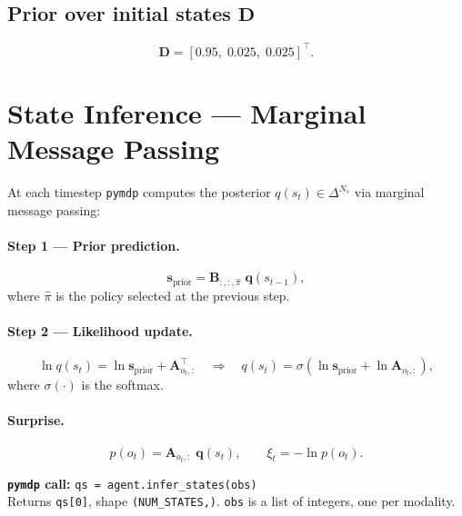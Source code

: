 \documentclass[11pt, a4paper]{article}
\newcommand{\vect}[1]{\bm{#1}}
\newcommand{\mat}[1]{\mathbf{#1}}
\begin{document}
\subsection{Prior over initial states $\mat{D}$}
\begin{equation}
  \mat{D} = [0.95,\; 0.025,\; 0.025]^\top.
\end{equation}

\section{State Inference — Marginal Message Passing}

At each timestep \texttt{pymdp} computes the posterior
$q(s_t) \in \Delta^{N_s}$ via marginal message passing:

\paragraph{Step 1 — Prior prediction.}
\begin{equation}
  \vect{s}_{\mathrm{prior}} = \mat{B}_{:,:,\hat{\pi}}\;\vect{q}(s_{t-1}),
\end{equation}
where $\hat{\pi}$ is the policy selected at the previous step.

\paragraph{Step 2 — Likelihood update.}
\begin{equation}
  \ln q(s_t) = \ln \vect{s}_{\mathrm{prior}}
             + \mat{A}_{o_t,:}^\top
  \quad\Rightarrow\quad
  q(s_t) = \sigma\!\left(\ln\vect{s}_{\mathrm{prior}}
                       + \ln\mat{A}_{o_t,:}\right),
\end{equation}
where $\sigma(\cdot)$ is the softmax.

\paragraph{Surprise.}
\begin{equation}
  p(o_t) = \mat{A}_{o_t,:}\;\vect{q}(s_t),
  \qquad
  \xi_t = -\ln p(o_t).
  \label{eq:surprise}
\end{equation}

\begin{pymdpbox}
\textbf{\texttt{pymdp} call:}
\texttt{qs = agent.infer\_states(obs)}\\
Returns \texttt{qs[0]}, shape \texttt{(NUM\_STATES,)}.
\texttt{obs} is a list of integers, one per modality.
\end{pymdpbox}
\end{document}
